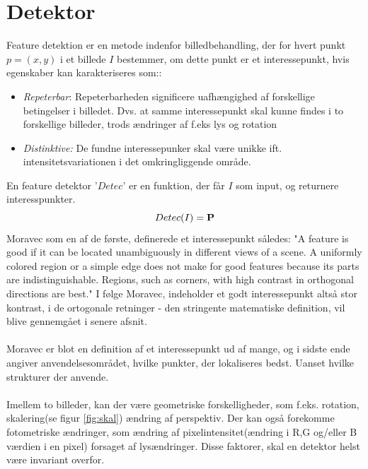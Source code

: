 \section{Detektor}\label{sec:detect}
Feature detektion er en metode indenfor billedbehandling, der for hvert punkt $p = (x,y)$ i et billede $I$ bestemmer, om dette punkt er et interessepunkt, hvis egenskaber kan karakteriseres som\cite{pointsurvey}::
\begin{itemize}
\item{\emph{Repeterbar}: Repeterbarheden significere uafhængighed af forskellige betingelser i billedet. Dvs. at samme interessepunkt skal kunne findes i to forskellige billeder, trods ændringer af f.eks lys og rotation}
\item{\emph{Distinktive:}
De fundne interessepunker skal være unikke ift. intensitetsvariationen i det omkringliggende område.} 
\end{itemize}
En feature detektor '$Detec$' er en funktion, der får $I$ som input, og returnere interesspunkter.
$$ Detec	(I)= \bold{P}$$
Moravec \cite{moravec} som en af de første, definerede et interessepunkt således: "A
feature is good if it can be located unambiguously in different views of a scene. A
uniformly colored region or a simple edge does not make for good features because
its parts are indistinguishable. Regions, such as corners, with high contrast in
orthogonal directions are best." I følge Moravec, indeholder et godt interessepunkt altså stor kontrast, i de ortogonale retninger - den stringente matematiske definition, vil blive gennemgået i senere afsnit. \\
\\
Moravec er blot en definition af et interessepunkt ud af mange, og i sidste ende angiver anvendelsesområdet, hvilke punkter, der lokaliseres bedst. Uanset hvilke strukturer der anvende.
\\
\\
Imellem to billeder, kan der være geometriske forskelligheder, som f.eks. rotation, skalering(se figur  \ref{fig:skal}) ændring af perspektiv. Der kan også forekomme fotometriske ændringer, som ændring af pixelintensitet(ændring i R,G og/eller B værdien i en pixel) forsaget af lysændringer. Disse faktorer, skal en detektor helst være invariant overfor.

